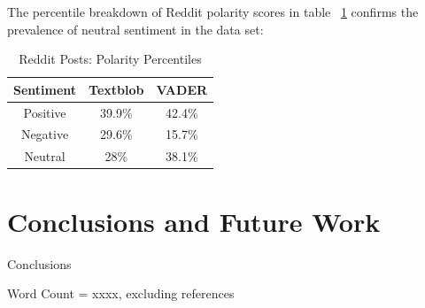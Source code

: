 \documentclass[conference]{IEEEtran}
\begin{document}

The percentile breakdown of Reddit polarity scores in table ~\ref{tab2} confirms the prevalence of neutral sentiment in the data set:

\begin{table}[htbp]
\caption{Reddit Posts: Polarity Percentiles }
\begin{center}
\begin{tabular}{|c|c|c|}
\hline
\textbf{Sentiment}&{\textbf{Textblob}}&{\textbf{VADER}} \\
\hline
Positive& 39.9\%&42.4\%\\
\hline
Negative& 29.6\%&15.7\%\\
\hline
Neutral& 28\%&38.1\%\\
\hline
\end{tabular}
\label{tab2}
\end{center}
\end{table}

\section{Conclusions and Future Work}

Conclusions

Word Count = xxxx, excluding references



\end{document}
